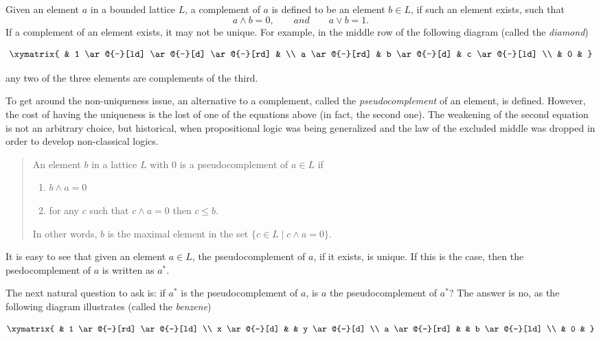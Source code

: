 \documentclass[12pt]{article}
\begin{document}
Given an element $a$ in a bounded lattice $L$, a complement of $a$ is defined to be an element $b\in L$, if such an element exists, such that 
$$a\wedge b=0,\qquad{ and }\qquad a\vee b =1.$$
If a complement of an element exists, it may not be unique.  For example, in the middle row of the following diagram (called the \emph{diamond})

\begin{equation*}
\xymatrix{
& 1 \ar@{-}[ld] \ar@{-}[d] \ar@{-}[rd] & \\
a \ar@{-}[rd] & b \ar@{-}[d] & c \ar@{-}[ld] \\
& 0 &
}
\end{equation*}

any two of the three elements are complements of the third.

To get around the non-uniqueness issue, an alternative to a complement, called the \emph{pseudocomplement} of an element, is defined.  However, the cost of having the uniqueness is the lost of one of the equations above (in fact, the second one).  The weakening of the second equation is not an arbitrary choice, but historical, when propositional logic was being generalized and the law of the excluded middle was dropped in order to develop non-classical logics.

\begin{quote}
An element $b$ in a lattice $L$ with $0$ is a pseudocomplement of $a\in L$ if 
\begin{enumerate}
\item $b\wedge a=0$
\item for any $c$ such that $c\wedge a=0$ then $c\le b$.
\end{enumerate}
In other words, $b$ is the maximal element in the set $\lbrace c\in L\mid c\wedge a=0\rbrace$.
\end{quote}

It is easy to see that given an element $a\in L$, the pseudocomplement of $a$, if it exists, is unique.  If this is the case, then the psedocomplement of $a$ is written as $a^*$.

The next natural question to ask is: if $a^*$ is the pseudocomplement of $a$, is $a$ the pseudocomplement of $a^*$?  The answer is no, as the following diagram illustrates (called the \emph{benzene})

\begin{equation*}
\xymatrix{
& 1 \ar@{-}[rd] \ar@{-}[ld] \\
x \ar@{-}[d] &  & y \ar@{-}[d] \\
a \ar@{-}[rd] & & b \ar@{-}[ld] \\
& 0 &
}
\end{equation*}
\end{document}
